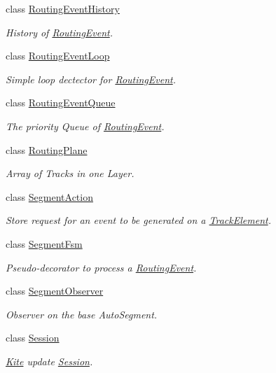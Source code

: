 \begin{DoxyCompactItemize}
class \hyperlink{classKite_1_1RoutingEventHistory}{Routing\+Event\+History}
\begin{DoxyCompactList}\small\item\em History of \hyperlink{classKite_1_1RoutingEvent}{Routing\+Event}. \end{DoxyCompactList}\item 
class \hyperlink{classKite_1_1RoutingEventLoop}{Routing\+Event\+Loop}
\begin{DoxyCompactList}\small\item\em Simple loop dectector for \hyperlink{classKite_1_1RoutingEvent}{Routing\+Event}. \end{DoxyCompactList}\item 
class \hyperlink{classKite_1_1RoutingEventQueue}{Routing\+Event\+Queue}
\begin{DoxyCompactList}\small\item\em The priority Queue of \hyperlink{classKite_1_1RoutingEvent}{Routing\+Event}. \end{DoxyCompactList}\item 
class \hyperlink{classKite_1_1RoutingPlane}{Routing\+Plane}
\begin{DoxyCompactList}\small\item\em Array of Tracks in one Layer. \end{DoxyCompactList}\item 
class \hyperlink{classKite_1_1SegmentAction}{Segment\+Action}
\begin{DoxyCompactList}\small\item\em Store request for an event to be generated on a \hyperlink{classKite_1_1TrackElement}{Track\+Element}. \end{DoxyCompactList}\item 
class \hyperlink{classKite_1_1SegmentFsm}{Segment\+Fsm}
\begin{DoxyCompactList}\small\item\em Pseudo-\/decorator to process a \hyperlink{classKite_1_1RoutingEvent}{Routing\+Event}. \end{DoxyCompactList}\item 
class \hyperlink{classKite_1_1SegmentObserver}{Segment\+Observer}
\begin{DoxyCompactList}\small\item\em Observer on the base Auto\+Segment. \end{DoxyCompactList}\item 
class \hyperlink{classKite_1_1Session}{Session}
\begin{DoxyCompactList}\small\item\em \hyperlink{namespaceKite}{Kite} update \hyperlink{classKite_1_1Session}{Session}. \end{DoxyCompactList}\item 

\end{DoxyCompactItemize}
